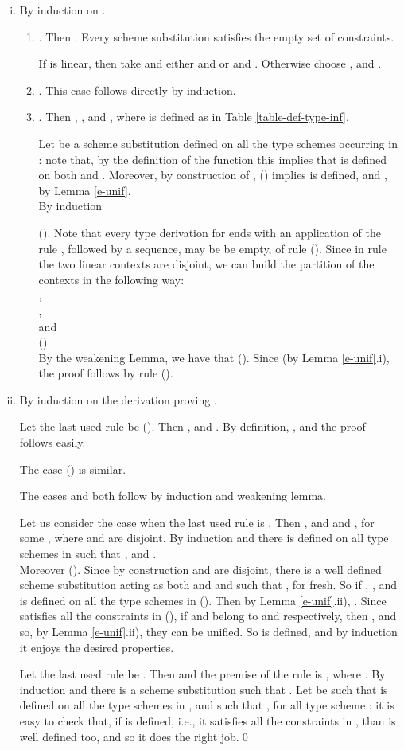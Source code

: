 \proof\hfill
\begin{enumerate}[i)] 
\item By induction on .
\begin{enumerate}[]
\item . Then .
Every scheme substitution  satisfies the empty set of constraints. 

If 
 is linear, then
take  and either  
and  
or  and . 
Otherwise choose 
, and .
\item . This case follows directly by induction.
\item . 
Then , 
, and 
,
where  is defined as in Table \ref{table-def-type-inf}.

Let  be a scheme substitution defined on all the type schemes occurring in :
note that, by the definition of the function  this implies that  is defined on both 
and . Moreover, by construction of ,  ()
implies  is defined, and ,
by Lemma \ref{e-unif}.\\
By induction 

(). Note that every type derivation for  ends with an application of the rule , followed by a sequence, 
may be be empty, of rule (). Since in rule  the two linear contexts are disjoint, we can build the partition of the contexts in
the following way:\\
,\\
,\\
 and\\
 ().\\
 By the weakening Lemma, we have that 
 (). 
Since  (by Lemma \ref{e-unif}.i), 
the proof follows by rule ().
\end{enumerate}
\item By induction on the derivation proving .

Let the last used rule be (). Then , and . By definition, 
, and the proof follows easily.

The case () is similar.

The cases  and  both follow by induction and weakening lemma.

Let us consider the case when the last used rule is . 
Then , and 
 and 
, for some ,
where  and  are disjoint.
By induction  and 
there is  defined on all type schemes in  such that ,
and .\\
Moreover 
 (). 
Since by construction  and  are disjoint, there is a well defined scheme substitution
 acting as both  and  and such that 
, for  fresh. So
if ,
, 
and  is defined on all the type schemes in
 ().
Then 
by Lemma \ref{e-unif}.ii), 
.
Since  satisfies all the constraints in  (), if 
 and  belong to  and 
respectively, then , and so, by Lemma \ref{e-unif}.ii), 
they can be unified.
So  is defined, and by 
induction it enjoys the desired properties.

Let the last used rule be . Then  and the premise of the rule is 
, where 
.
By induction  and there is a scheme substitution 
such that .
Let  be such that  is defined on all the type schemes in , and
such that , for all 
type scheme : it is easy to check that, if  is defined, i.e., it satisfies all the constraints in , than  is 
well defined too, and so it does the right job.\qed
\end{enumerate}



